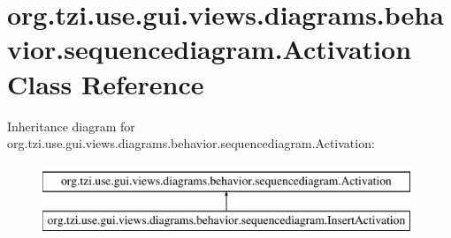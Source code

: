 \hypertarget{classorg_1_1tzi_1_1use_1_1gui_1_1views_1_1diagrams_1_1behavior_1_1sequencediagram_1_1_activation}{\section{org.\-tzi.\-use.\-gui.\-views.\-diagrams.\-behavior.\-sequencediagram.\-Activation Class Reference}
\label{classorg_1_1tzi_1_1use_1_1gui_1_1views_1_1diagrams_1_1behavior_1_1sequencediagram_1_1_activation}
}
Inheritance diagram for org.\-tzi.\-use.\-gui.\-views.\-diagrams.\-behavior.\-sequencediagram.\-Activation\-:\begin{figure}[H]
\begin{center}
\leavevmode
\includegraphics[height=2.000000cm]{classorg_1_1tzi_1_1use_1_1gui_1_1views_1_1diagrams_1_1behavior_1_1sequencediagram_1_1_activation}
\end{center}
\end{figure}
